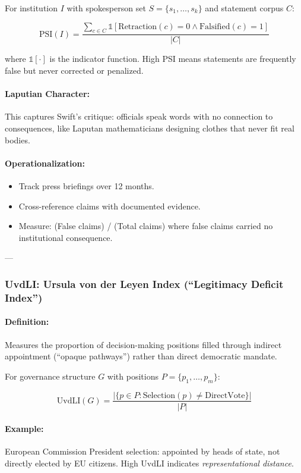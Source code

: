 \documentclass[11pt,a4paper]{article}
\theoremstyle{definition}
\theoremstyle{remark}
\begin{document}
For institution $I$ with spokesperson set $S = \{s_1, \dots, s_k\}$ and statement corpus $C$:

\[
\text{PSI}(I) = \frac{\sum_{c \in C} \mathbb{1}[\text{Retraction}(c) = 0 \land \text{Falsified}(c) = 1]}{|C|}
\]

where $\mathbb{1}[\cdot]$ is the indicator function. High PSI means statements are frequently false but never corrected or penalized.

\paragraph{Laputian Character:}
This captures Swift's critique: officials speak words with no connection to consequences, like Laputan mathematicians designing clothes that never fit real bodies.

\paragraph{Operationalization:}
\begin{itemize}
\item Track press briefings over 12 months.
\item Cross-reference claims with documented evidence.
\item Measure: (False claims) / (Total claims) where false claims carried no institutional consequence.
\end{itemize}

---

\subsubsection{UvdLI: Ursula von der Leyen Index (``Legitimacy Deficit Index'')}

\paragraph{Definition:}
Measures the proportion of decision-making positions filled through indirect appointment (``opaque pathways'') rather than direct democratic mandate.

For governance structure $G$ with positions $P = \{p_1, \dots, p_m\}$:

\[
\text{UvdLI}(G) = \frac{|\{p \in P : \text{Selection}(p) \neq \text{DirectVote}\}|}{|P|}
\]

\paragraph{Example:}
European Commission President selection: appointed by heads of state, not directly elected by EU citizens. High UvdLI indicates \textit{representational distance}.
\end{document}
